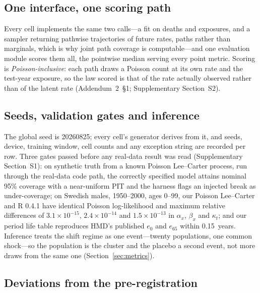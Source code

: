 \subsection{One interface, one scoring path}
\label{sec:design-interface}

Every cell implements the same two calls---a fit on deaths and exposures, and a
sampler returning pathwise trajectories of future rates, paths rather than
marginals, which is why joint path coverage is computable---and one evaluation
module scores them all, the pointwise median serving every point metric. Scoring
is \emph{Poisson-inclusive}: each path draws a Poisson count at its own rate and
the test-year exposure, so the law scored is that of the rate actually observed
rather than of the latent rate (Addendum~2~\S1; Supplementary Section~S2).

\subsection{Seeds, validation gates and inference}
\label{sec:design-gates}

The global seed is 20260825; every cell's generator derives from it, and seeds,
device, training window, cell counts and any exception string are recorded per
row. Three gates passed before any real-data result was read (Supplementary
Section~S1): on synthetic truth from a known Poisson Lee--Carter process, run
through the real-data code path, the correctly specified model attains nominal
95\% coverage with a near-uniform PIT and the harness flags an injected break as
under-coverage; on Swedish males, 1950--2000, ages 0--99, our Poisson
Lee--Carter and R  0.4.1 have identical Poisson log-likelihood and
maximum relative differences of $3.1\times10^{-15}$, $2.4\times10^{-14}$ and
$1.5\times10^{-13}$ in $\alpha_x$, $\beta_x$ and $\kappa_t$; and our period life
table reproduces HMD's published $e_0$ and $e_{65}$ within 0.15~years. Inference
treats the shift regime as one event---twenty populations, one common shock---so
the population is the cluster and the placebo a second event, not more draws
from the same one (Section~\ref{sec:metrics}).

\subsection{Deviations from the pre-registration}
\label{sec:design-deviations}

